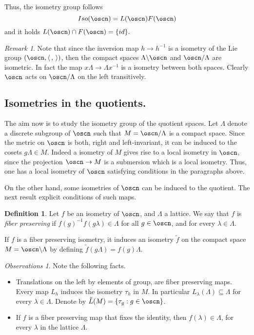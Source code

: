 \documentclass[11pt]{amsart}
\newcommand{\lela}{\left \langle}
\newcommand{\rira}{\right \rangle}
\theoremstyle{plain}
\theoremstyle{definition}
\newtheorem{defn}[thm]{Definition}
\theoremstyle{remark}
\newtheorem{rem}{Remark}
\newtheorem{obs}[thm]{Observations}
\begin{document}
Thus, the isometry group follows 
$$Iso(\oscn)=L(\oscn) F(\oscn)$$
 and it holds $L(\oscn)\cap F(\oscn)=\{id\}.$


\begin{rem}
	Note that since the inversion map $h\to h^{-1}$ is a isometry of the Lie group  $(\oscn, \lela\,,\,\rira)$, then the compact spaces $\Lambda \backslash \oscn$ and $\oscn/\Lambda$ are isometric. In fact the map $x\Lambda \to \Lambda x^{-1}$ is a isometry between both spaces. Clearly $\oscn$ acts on $\oscn/\Lambda$ on the left transitively.
\end{rem}

\subsection{Isometries in the quotients. } The aim now is to study the isometry group of the quotient spaces. Let $\Lambda$ denote a discrete subgroup of $\oscn$ such that  $M=\oscn/\Lambda$ is a compact space. Since the metric on $\oscn$ is both, right and left-invariant, it can be induced to the cosets $g\Lambda\in M$. Indeed a isometry of $M$ gives rise to a local isometry in $\oscn$, since the projection $\oscn \to M$ is a submersion which is a local isometry. Thus, one has a local isometry of $\oscn$ satisfying conditions in the paragraphs above. 

On the other hand, some isometries of $\oscn$ can be induced to the quotient. The next result explicit conditions of such maps. %

\begin{defn} Let $f$ be  an isometry of $\oscn$, and $\Lambda$ a lattice. We say that $f$ is {\em fiber preserving} if $f(g)^{-1} f(g\lambda) \in\Lambda$ for all $g \in \oscn$, and for every $\lambda\in \Lambda$. 
\end{defn}
		If $f$ is a fiber preserving
isometry, it induces an isometry  $\tilde{f}$ on the compact space $M=\oscn\backslash \Lambda$   by defining $\tilde{f}(g\Lambda) = f(g)\Lambda$. 


\begin{obs} Note the following facts. 
	\begin{itemize}
		\item Translations on the left by elements of group, are fiber preserving maps. Every map $L_h$ induces the isometry $\tau_h$ in $M$. In particular $L_{\lambda}(\Lambda)\subseteq \Lambda$ for every $\lambda\in \Lambda$. Denote by  $\tilde{L}(M)=\{\tau_g:g\in \oscn\}$. 
		\item If $f$ is a fiber preserving map that fixes the identity, then $f(\lambda)\in \Lambda$, for every $\lambda$ in the lattice $\Lambda$. 
	\end{itemize}
	
\end{obs}
\end{document}
